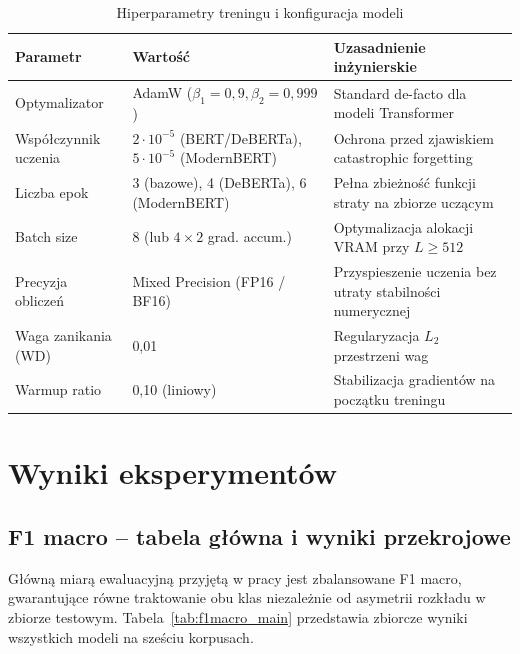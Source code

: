 \documentclass[12pt,a4paper,twoside]{report}
\begin{document}
\begin{table}[H]\centering
\caption{Hiperparametry treningu i konfiguracja modeli}\label{tab:hyperparams}
\begin{tabularx}{\textwidth}{p{3.8cm} p{4.4cm} X}
\toprule
\rowcolor{headerblue}
\color{white}\textbf{Parametr} & \color{white}\textbf{Wartość} & \color{white}\textbf{Uzasadnienie inżynierskie} \\
\midrule
Optymalizator & AdamW ($\beta_1=0,9, \beta_2=0,999$) & Standard de-facto dla modeli Transformer \\
Współczynnik uczenia & $2\cdot 10^{-5}$ (BERT/DeBERTa), $5\cdot 10^{-5}$ (ModernBERT) & Ochrona przed zjawiskiem catastrophic forgetting \\
Liczba epok & 3 (bazowe), 4 (DeBERTa), 6 (ModernBERT) & Pełna zbieżność funkcji straty na zbiorze uczącym \\
Batch size & 8 (lub $4 \times 2$ grad. accum.) & Optymalizacja alokacji VRAM przy $L \ge 512$ \\
Precyzja obliczeń & Mixed Precision (FP16 / BF16) & Przyspieszenie uczenia bez utraty stabilności numerycznej \\
Waga zanikania (WD) & 0,01 & Regularyzacja $L_2$ przestrzeni wag \\
Warmup ratio & 0,10 (liniowy) & Stabilizacja gradientów na początku treningu \\
\bottomrule
\end{tabularx}
\end{table}

\chapter{Wyniki eksperymentów}\label{ch:results}

\section{F1 macro -- tabela główna i wyniki przekrojowe}
Główną miarą ewaluacyjną przyjętą w pracy jest zbalansowane F1 macro, gwarantujące równe traktowanie obu klas niezależnie od asymetrii rozkładu w zbiorze testowym. Tabela~\ref{tab:f1macro_main} przedstawia zbiorcze wyniki wszystkich modeli na sześciu korpusach.
\end{document}
